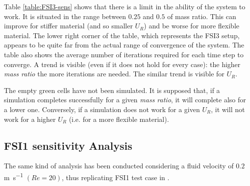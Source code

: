 Table \ref{table:FSI3-sens} shows that there is a limit in the ability of the system to work. It is situated in the range between $0.25$ and $0.5$ of mass ratio. This can improve for stiffer material (and so smaller $U_R$) and be worse for more flexible material. The lower right corner of the table, which represents the FSI3 setup, appears to be quite far from the actual range of convergence of the system. The table also shows the average number of iterations required for each time step to converge. A trend is visible (even if it does not hold for every case): the higher \textit{mass ratio} the more iterations are needed. The similar trend is visible for $U_R$.


The empty green cells have not been simulated. It is supposed that, if a simulation completes successfully for a given \textit{mass ratio}, it will complete also for a lower one. Conversely, if a simulation does not work for a given $U_R$, it will not work for a higher $U_R$ (i.e. for a more flexible material).   


\subsection{FSI1 sensitivity Analysis}

The same kind of analysis has been conducted considering a fluid velocity of $0.2$\si{m.s^{-1}} $(Re=20)$, thus replicating FSI1 test case in \cite{turek2006proposal}.  

